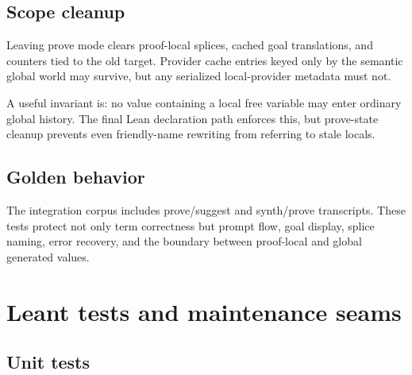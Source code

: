 \documentclass[10pt,letterpaper,oneside]{report}
\newcommand{\code}[1]{\texttt{\detokenize{#1}}}
\begin{document}
\section{Scope cleanup}

Leaving prove mode clears proof-local \code{it} splices, cached goal translations, and counters tied to the old target. Provider cache entries keyed only by the semantic global world may survive, but any serialized local-provider metadata must not.

A useful invariant is: no value containing a local free variable may enter ordinary global history. The final Lean declaration path enforces this, but prove-state cleanup prevents even friendly-name rewriting from referring to stale locals.

\section{Golden behavior}

The integration corpus includes prove/suggest and synth/prove transcripts. These tests protect not only term correctness but prompt flow, goal display, splice naming, error recovery, and the boundary between proof-local and global generated values.

\chapter{Leant tests and maintenance seams}\label{ch:leant-tests}

\section{Unit tests}
\end{document}
